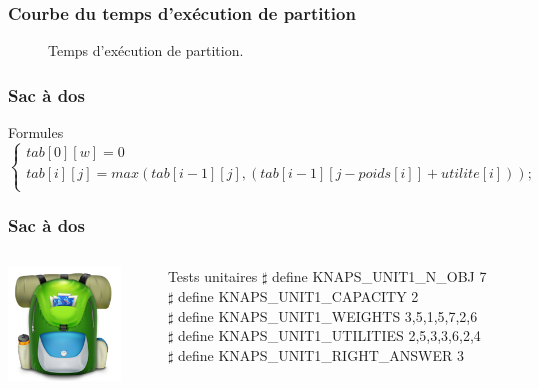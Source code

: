 \documentclass[french]{beamer}
\begin{document}
\begin{frame}
\frametitle{Courbe du temps d'exécution de partition}
\begin{figure}[h!]
\centering
{}
\caption{Temps d'exécution de partition.}
\end{figure}

  \end{frame}
  
  
  \begin{frame}
    \frametitle{Sac à dos}
    \begin{alertblock}{Formules}
      \begin{equation}
        \begin{cases}
          tab[0][w] = 0 \\
          tab[i][j] = max(tab[i-1] [j], (tab[i-1] [j-poids[i]] + utilite[i])); \\
        \end{cases}
      \end{equation}
    \end{alertblock}
  \end{frame}

\begin{frame}
  \frametitle{Sac à dos}
  \begin{columns}
    \begin{column}[]{3cm}
      \begin{center}
        \includegraphics[height=3cm]{Knapsack.png}
      \end{center}
    \end{column}
      \begin{column}[]{7cm}
        \begin{block}{Tests unitaires}
$\sharp$ define KNAPS\_UNIT1\_N\_OBJ 7 \\
$\sharp$ define KNAPS\_UNIT1\_CAPACITY 2 \\
$\sharp$ define KNAPS\_UNIT1\_WEIGHTS   {3,5,1,5,7,2,6} \\
$\sharp$ define KNAPS\_UNIT1\_UTILITIES {2,5,3,3,6,2,4} \\
$\sharp$ define KNAPS\_UNIT1\_RIGHT\_ANSWER 3 \\
        \end{block}
      \end{column}
    \end{columns}
  \end{frame}
\end{document}
